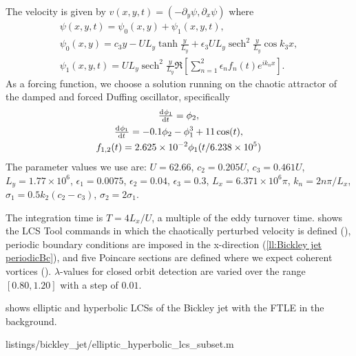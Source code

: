 \documentclass[5p]{elsarticle}
\DeclareMathOperator{\sech}{sech}
\begin{document}
The velocity is given by $v(x,y,t) = (-\partial_y \psi, \partial_x \psi)$ where
\begin{gather*}
\psi(x,y,t) = \psi_0(x,y) + \psi_1(x,y,t),\\
\psi_0(x,y) = c_3 y - U L_y \tanh\frac{y}{L_y} + \epsilon_3 U L_y \sech^2\frac{y}{L_y} \cos k_3 x,\\
\psi_1(x,y,t) = U L_y \sech^2\frac{y}{L_y} \Re\left[\sum_{n=1}^2 \epsilon_n f_n(t) e^{i k_n x}\right].
\end{gather*}
As a forcing function, we choose a solution running on the chaotic attractor of the damped and forced Duffing oscillator, specifically
\begin{gather*}
\od{\phi_1}{t} = \phi_2,\\
\od{\phi_1}{t} = -0.1 \phi_2 - \phi_1^3 + 11 \cos(t),\\
f_{1,2}(t) = 2.625 \times 10^{-2} \phi_1(t/6.238 \times 10^5)
\end{gather*}
The parameter values we use are: $U = 62.66$, $c_2 = 0.205 U$, $c_3 = 0.461 U$, $L_y = 1.77 \times 10^6$, $\epsilon_1 = 0.0075$, $\epsilon_2 = 0.04$, $\epsilon_3 = 0.3$, $L_x = 6.371 \times 10^6 \pi$, $k_n = 2 n \pi/L_x$, $\sigma_1 = 0.5 k_2 (c_2 - c_3)$, $\sigma_2 = 2 \sigma_1$.

The integration time is $T = 4L_x/U$, a multiple of the eddy turnover time.  shows the LCS Tool commands in which the chaotically perturbed velocity is defined (), periodic boundary conditions are imposed in the x-direction (\cref{ll:Bickley jet periodicBc}), and five Poincare sections are defined where we expect coherent vortices ().
$\lambda$-values for closed orbit detection are varied over the range $[0.80,1.20]$ with a step of $0.01$.

 shows elliptic and hyperbolic LCSs of the Bickley jet with the FTLE in the background.


        {listings/bickley_jet/elliptic_hyperbolic_lcs_subset.m}
\end{document}
